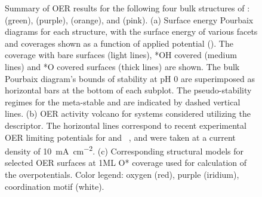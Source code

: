 \begin{figure}
\centering
{}
\caption{\label{fig:oer_volcano}
%
Summary of OER results for the following four bulk structures of \IrOx: \rIrOtwo (green), \aIrOthree (purple), \rIrOthree (orange), and \bIrOthree (pink).
%
(a) Surface energy Pourbaix diagrams for each structure, with the surface energy of various facets and coverages shown as a function of applied potential (\VRHE).
%
The coverage with bare surfaces (light lines), *OH covered  (medium lines) and *O covered surfaces (thick lines) are shown.
%
The bulk Pourbaix diagram's bounds of stability at pH \num{0} are superimposed as horizontal bars at the bottom of each subplot.
%
The pseudo-stability regimes for the meta-stable \bIrOthree and \rIrOthree are indicated by dashed vertical lines.
%
(b) OER activity volcano for \IrOx systems considered utilizing the \DGOmOH descriptor.
%
The horizontal lines correspond to recent experimental OER limiting potentials for \IrOtwo and \IrOthree~\cite{Seitz2016}, and were taken at a current density of \SI[mode=text]{10}{\mA\per\cm\squared}.
%
(c) Corresponding structural models for selected OER surfaces at 1ML O* coverage used for calculation of the overpotentials.
%
%
Color legend: oxygen (red), purple (iridium), coordination motif (white).
}
\end{figure}


